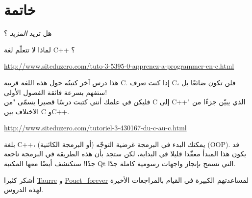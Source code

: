 \chapter*{خاتمة}

هل تريد
\textit{المزيد}
؟

لماذا لا تتعلّم لغة \textenglish{C++}
؟

\url{http://www.siteduzero.com/tuto-3-5395-0-apprenez-a-programmer-en-c.html}

 هذا درس آخر كتبتُه حول هذه اللغة قريبة \textenglish{C}.
 إذا كنت تعرف \textenglish{C}،
فلن تكون ضائعًا بل ستفهم بسرعة فائقة الفصول الأولى!\\
فليكن في علمك أنني كتبت درسًا قصيرا يسمّى "من \textenglish{C}
إلى \textenglish{C++}"
الذي يبيّن جزءًا من الاختلاف بين \textenglish{C}
و\textenglish{C++}.

\url{http://www.siteduzero.com/tutoriel-3-430167-du-c-au-c.html}

بلغة \textenglish{C++}،
يمكنك البدء في البرمجة غرضية التوجّه (أو البرمجة الكائنية) (\textenglish{OOP}).
قد يكون هذا المبدأ معقّدا قليلا في البداية، لكن ستجد بأن هذه الطريقة في البرمجة ناجعة جدًا! ستكتشف أيضًا معها المكتبة
\textenglish{Qt}
التي تسمح بإنجاز واجهات رسومية كاملة جدّا.

أشكر كثيرا
\href{http://www.siteduzero.com/membres-294-45753.html}{Taurre}
و
\href{http://www.siteduzero.com/membres-294-181268.html}{Pouet\_forever}
لمساعدتهم الكبيرة في القيام بالمراجعات الأخيرة لهذه الدروس.
\cleardoublepage
